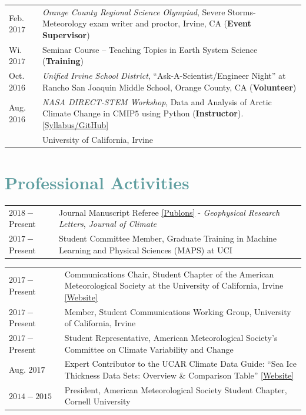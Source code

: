 \documentclass[margin,line,palatino,courier,10pt]{res}
\begin{document}
\begin{resume}
\begin{tabular}{@{}p{0.8in}p{4in}}
Feb. $2017$ & \textit{Orange County Regional Science Olympiad}, Severe Storms-Meteorology exam writer and proctor, Irvine, CA (\textbf{Event Supervisor})\\
Wi. $2017$ & Seminar Course -- Teaching Topics in Earth System Science (\textbf{Training})\\
Oct. $2016$ & \textit{Unified Irvine School District}, ``Ask-A-Scientist/Engineer Night'' at Rancho San Joaquin Middle School, Orange County, CA (\textbf{Volunteer})\\
Aug. $2016$ & \textit{NASA DIRECT-STEM Workshop}, Data and Analysis of Arctic Climate Change in CMIP$5$ using Python (\textbf{Instructor}). \href{https://github.com/strongh/DIRECT-STEM-climate-workshop}{[Syllabus/GitHub]}\\
& University of California, Irvine\\
\end{tabular}

\vspace{-0.1in}
\noindent\makebox[\linewidth][r]{\rule{\textwidth}{5pt}}
\section{\sc \textcolor{CadetBlue}{\large{Professional Activities}}}
\vspace*{0.05in}
\begin{tabular}{@{}p{0.8in}p{4in}}
$2018 -$Present & Journal Manuscript Referee \href{https://publons.com/author/1521902/zachary-labe#profile}{[Publons]} - \textit{Geophysical Research Letters}, \textit{Journal of Climate}\\
$2017 -$Present & Student Committee Member, Graduate Training in Machine Learning and Physical Sciences (MAPS) at UCI\\
\end{tabular}
\begin{tabular}{@{}p{0.8in}p{4in}}
$2017 - $Present & Communications Chair, Student Chapter of the American Meteorological Society at the University of California, Irvine \href{http://sites.uci.edu/zotcams/}{[Website]}\\
$2017 - $Present & Member, Student Communications Working Group, University of California, Irvine\\
$2017- $Present & Student Representative, American Meteorological Society's Committee on Climate Variability and Change\\
Aug. $2017$ & Expert Contributor to the UCAR Climate Data Guide: ``Sea Ice Thickness Data Sets: Overview \& Comparison Table'' \href{https://climatedataguide.ucar.edu/climate-data/sea-ice-thickness-data-sets-overview-comparison-table}{[Website]}\\
$2014-2015$ & President, American Meteorological Society Student Chapter, Cornell University\\
\end{tabular}


\end{resume}
\end{document}
